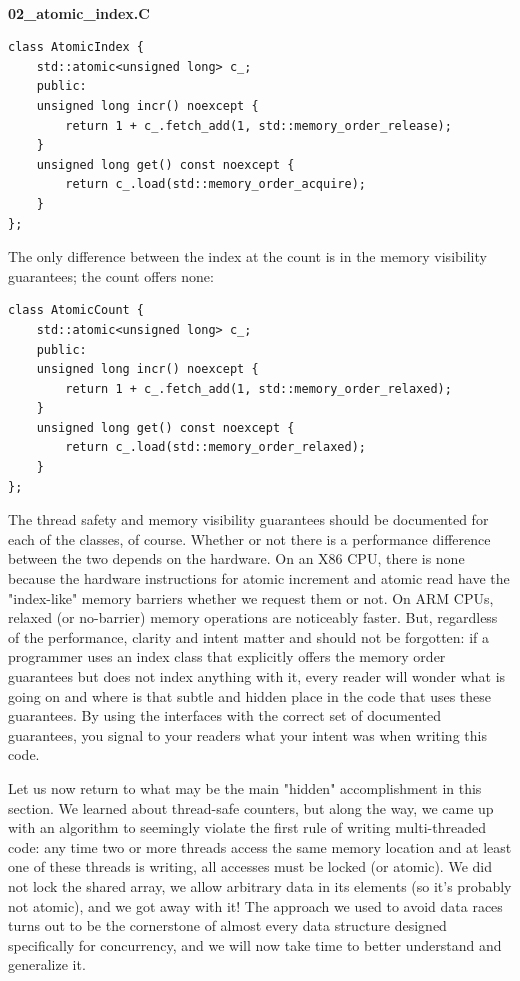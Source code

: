 \hspace*{\fill} \\ %
\noindent
\textbf{02\_atomic\_index.C}
\begin{lstlisting}[style=styleCXX]
class AtomicIndex {
	std::atomic<unsigned long> c_;
	public:
	unsigned long incr() noexcept {
		return 1 + c_.fetch_add(1, std::memory_order_release);
	}
	unsigned long get() const noexcept {
		return c_.load(std::memory_order_acquire);
	}
};
\end{lstlisting}

The only difference between the index at the count is in the memory visibility guarantees; the count offers none:

\begin{lstlisting}[style=styleCXX]
class AtomicCount {
	std::atomic<unsigned long> c_;
	public:
	unsigned long incr() noexcept {
		return 1 + c_.fetch_add(1, std::memory_order_relaxed);
	}
	unsigned long get() const noexcept {
		return c_.load(std::memory_order_relaxed);
	}
};
\end{lstlisting}

The thread safety and memory visibility guarantees should be documented for each of the classes, of course. Whether or not there is a performance difference between the two depends on the hardware. On an X86 CPU, there is none because the hardware instructions for atomic increment and atomic read have the "index-like" memory barriers whether we request them or not. On ARM CPUs, relaxed (or no-barrier) memory operations are noticeably faster. But, regardless of the performance, clarity and intent matter and should not be forgotten: if a programmer uses an index class that explicitly offers the memory order guarantees but does not index anything with it, every reader will wonder what is going on and where is that subtle and hidden place in the code that uses these guarantees. By using the interfaces with the correct set of documented guarantees, you signal to your readers what your intent was when writing this code.

Let us now return to what may be the main "hidden" accomplishment in this section. We learned about thread-safe counters, but along the way, we came up with an algorithm to seemingly violate the first rule of writing multi-threaded code: any time two or more threads access the same memory location and at least one of these threads is writing, all accesses must be locked (or atomic). We did not lock the shared array, we allow arbitrary data in its elements (so it's probably not atomic), and we got away with it! The approach we used to avoid data races turns out to be the cornerstone of almost every data structure designed specifically for concurrency, and we will now take time to better understand and generalize it.

